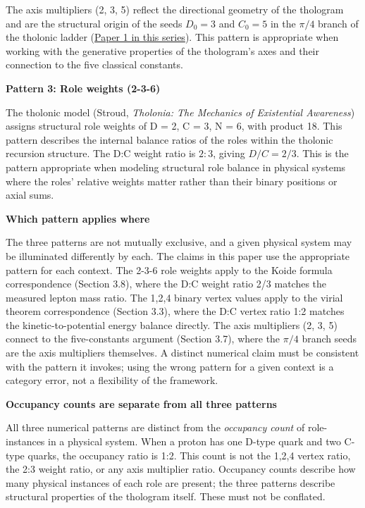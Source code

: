 \documentclass[
  11pt,
  letterpaper,
]{article}
\begin{document}
The axis multipliers (2, 3, 5) reflect the directional geometry of the
thologram and are the structural origin of the seeds \(D_0 = 3\) and
\(C_0 = 5\) in the \(\pi/4\) branch of the tholonic ladder
(\href{https://github.com/baardev/truevalue/blob/main/docnav/Research/papers/1_recursive-tholonic-five-constants/1_recursive-tholonic-five-constants.pdf}{Paper
1 in this series}). This pattern is appropriate when working with the
generative properties of the thologram's axes and their connection to
the five classical constants.

\textbf{Pattern 3: Role weights (2-3-6)}

The tholonic model (Stroud, \emph{Tholonia: The Mechanics of Existential
Awareness}) assigns structural role weights of D = 2, C = 3, N = 6, with
product 18. This pattern describes the internal balance ratios of the
roles within the tholonic recursion structure. The D:C weight ratio is
\(2:3\), giving \(D/C = 2/3\). This is the pattern appropriate when
modeling structural role balance in physical systems where the roles'
relative weights matter rather than their binary positions or axial
sums.

\textbf{Which pattern applies where}

The three patterns are not mutually exclusive, and a given physical
system may be illuminated differently by each. The claims in this paper
use the appropriate pattern for each context. The 2-3-6 role weights
apply to the Koide formula correspondence (Section 3.8), where the D:C
weight ratio 2/3 matches the measured lepton mass ratio. The 1,2,4
binary vertex values apply to the virial theorem correspondence (Section
3.3), where the D:C vertex ratio 1:2 matches the kinetic-to-potential
energy balance directly. The axis multipliers (2, 3, 5) connect to the
five-constants argument (Section 3.7), where the \(\pi/4\) branch seeds
are the axis multipliers themselves. A distinct numerical claim must be
consistent with the pattern it invokes; using the wrong pattern for a
given context is a category error, not a flexibility of the framework.

\textbf{Occupancy counts are separate from all three patterns}

All three numerical patterns are distinct from the \emph{occupancy
count} of role-instances in a physical system. When a proton has one
D-type quark and two C-type quarks, the occupancy ratio is 1:2. This
count is not the 1,2,4 vertex ratio, the 2:3 weight ratio, or any axis
multiplier ratio. Occupancy counts describe how many physical instances
of each role are present; the three patterns describe structural
properties of the thologram itself. These must not be conflated.
\end{document}
